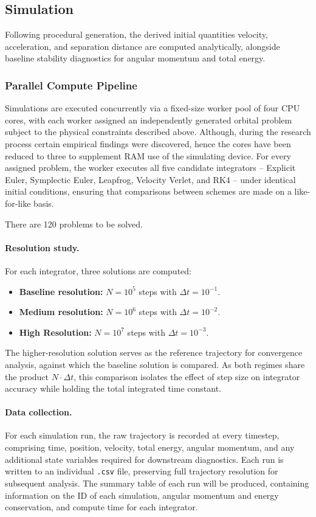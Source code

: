\subsection{Simulation}

Following procedural generation, the derived initial quantities velocity, acceleration, and separation distance
are computed analytically, alongside baseline stability diagnostics for angular momentum and total energy.

\subsubsection{Parallel Compute Pipeline}

Simulations are executed concurrently via a fixed-size worker pool of four CPU cores, with each worker assigned an
independently generated orbital problem subject to the physical constraints described above.
Although, during the research process certain empirical findings were discovered, hence the cores have been reduced to three
to supplement RAM use of the simulating device.
For every assigned problem, the worker executes all five candidate integrators -- Explicit Euler, Symplectic Euler,
Leapfrog, Velocity Verlet, and RK4 -- under identical initial conditions, ensuring that comparisons between schemes
are made on a like-for-like basis.

There are 120 problems to be solved.

\paragraph{Resolution study.}
For each integrator, three solutions are computed:
\begin{itemize}
    \item \textbf{Baseline resolution:} $N = 10^5$ steps with $\Delta t = 10^{-1}$.
    \item \textbf{Medium resolution:} $N = 10^6$ steps with $\Delta t = 10^{-2}$.
    \item \textbf{High Resolution:} $N = 10^7$ steps with $\Delta t = 10^{-3}$.
\end{itemize}
The higher-resolution solution serves as the reference trajectory for convergence analysis, against which the
baseline solution is compared. As both regimes share the product $N \cdot \Delta t$, this comparison isolates the
effect of step size on integrator accuracy while holding the total integrated time constant.

\paragraph{Data collection.}
For each simulation run, the raw trajectory is recorded at every timestep, comprising time, position, velocity,
total energy, angular momentum, and any additional state variables required for downstream diagnostics. Each run
is written to an individual \texttt{.csv} file, preserving full trajectory resolution for subsequent analysis.
The summary table of each run will be produced, containing information on the ID of each simulation, angular momentum
and energy conservation, and compute time for each integrator.

